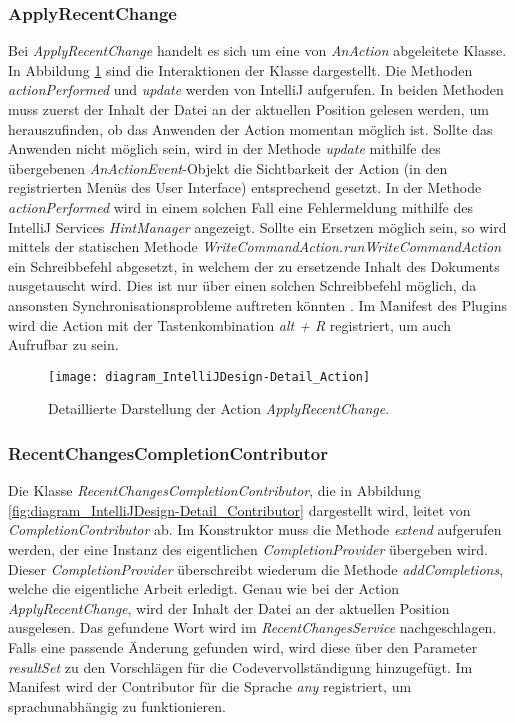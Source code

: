 \subsubsection{ApplyRecentChange}

Bei \emph{ApplyRecentChange} handelt es sich um eine von
\emph{AnAction} abgeleitete Klasse. In Abbildung
\ref{fig:diagram_IntelliJDesign-Detail_Action} sind die Interaktionen
der Klasse dargestellt. Die Methoden \emph{actionPerformed} und \emph{update}
werden von IntelliJ aufgerufen. In beiden Methoden muss zuerst
der Inhalt der Datei an der aktuellen Position gelesen werden, um 
herauszufinden, ob das Anwenden der Action momentan möglich ist.
Sollte das Anwenden nicht möglich sein, wird
in der Methode \emph{update} mithilfe des übergebenen
\emph{AnActionEvent}-Objekt die Sichtbarkeit der Action (in den
registrierten Menüs des User Interface) entsprechend gesetzt.
In der Methode \emph{actionPerformed} wird in einem solchen Fall
eine Fehlermeldung mithilfe des IntelliJ Services \emph{HintManager}
angezeigt. Sollte ein Ersetzen möglich sein,
so wird mittels der statischen Methode 
\emph{WriteCommandAction.runWriteCommandAction} ein Schreibbefehl
abgesetzt, in welchem der zu ersetzende Inhalt des Dokuments 
ausgetauscht wird. Dies ist nur über einen solchen Schreibbefehl möglich,
da ansonsten Synchronisationsprobleme auftreten könnten
\cite{IntelliJPlatformSDKSafelyReplacingText,IntelliJPlatformSDKGeneralThreadingRules}.
Im Manifest des Plugins wird die Action mit der 
Tastenkombination \emph{alt + R} registriert, um
auch Aufrufbar zu sein.

\begin{figure}
    \centering
    \texttt{[image: diagram\_IntelliJDesign-Detail\_Action]}
    \caption{Detaillierte Darstellung der Action \emph{ApplyRecentChange}.}
    \label{fig:diagram_IntelliJDesign-Detail_Action}
\end{figure}

\subsubsection{RecentChangesCompletionContributor}

Die Klasse \emph{RecentChangesCompletionContributor}, die in Abbildung
\ref{fig:diagram_IntelliJDesign-Detail_Contributor} dargestellt wird,
leitet von \emph{CompletionContributor} ab. Im Konstruktor muss
die Methode \emph{extend} aufgerufen werden, der eine Instanz 
des eigentlichen \emph{CompletionProvider} übergeben wird.
Dieser \emph{CompletionProvider} überschreibt wiederum die 
Methode \emph{addCompletions}, welche die eigentliche Arbeit erledigt.
Genau wie bei der Action \emph{ApplyRecentChange}, wird der
Inhalt der Datei an der aktuellen Position ausgelesen. Das gefundene
Wort wird im \emph{RecentChangesService} nachgeschlagen.
Falls eine passende Änderung gefunden wird, wird diese über den 
Parameter \emph{resultSet} zu den Vorschlägen für die Codevervollständigung
hinzugefügt.
Im Manifest wird der Contributor für die Sprache \emph{any} registriert,
um sprachunabhängig zu funktionieren.

